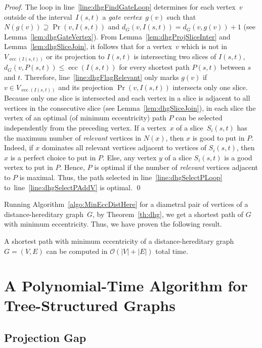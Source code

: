\documentclass[10pt]{llncs}
\newcommand{\calO}{\mathcal{O}}
\DeclareMathOperator{\ecc}{ecc}
\begin{document}
\begin{proof}
The loop in line~\ref{line:dhgFindGateLoop} determines for each vertex~$v$ outside of the interval~$I(s,t)$ a \emph{gate vertex}~$g(v)$ such that $N(g(v)) \supseteq \Pr(v, I(s,t))$ and $d_G(v, I(s,t)) = d_G(v, g(v)) + 1$ (see Lemma~\ref{lem:dhgGateVertex}).
From Lemma~\ref{lem:dhgProjSliceInter} and Lemma~\ref{lem:dhgSliceJoin}, it follows that for a vertex~$v$ which is not in $V_{\ecc(I(s,t))}$ or its projection to $I(s,t)$ is intersecting two slices of $I(s,t)$, $d_G(v,P(s,t)) \leq \ecc(I(s,t))$ for every shortest path $P(s,t)$ between $s$ and $t$.
Therefore, line~\ref{line:dhgFlagRelevant} only marks $g(v)$ if $v \in V_{\ecc(I(s,t))}$ and its projection $\Pr(v, I(s,t))$ intersects only one slice. 
Because only one slice is intersected and each vertex in a slice is adjacent to all vertices in the consecutive slice (see Lemma~\ref{lem:dhgSliceJoin}), in each slice the vertex of an optimal (of minimum eccentricity) path $P$ can be selected independently from the preceding vertex.
If a vertex~$x$ of a slice~$S_i(s,t)$ has the maximum number of \emph{relevant} vertices in $N(x)$, then $x$ is good to put in $P$.
Indeed, if $x$ dominates all relevant vertices adjacent to vertices of $S_i(s,t)$, then $x$ is a perfect choice to put in $P$.
Else, any vertex $y$ of a slice $S_i(s,t)$ is a good vertex to put in $P$. 
Hence, $P$ is optimal if the number of \emph{relevant} vertices adjacent to $P$ is maximal.
Thus, the path selected in line~\ref{line:dhgSelectPLoop} to~line~\ref{line:dhgSelectPAddV} is optimal.
\qed
\end{proof}

Running Algorithm~\ref{algo:MinEccDistHere} for a diametral pair of vertices of a distance-hereditary graph~$G$, by Theorem~\ref{th:dhg}, we get a shortest path of $G$ with minimum eccentricity.
Thus, we have proven the following result. 

\begin{theorem}
    \label{tm:opt-path} 
A shortest path with minimum eccentricity of a distance-hereditary graph $G=(V,E)$ can be computed in $\calO(|V| + |E|)$ total time.
\end{theorem}

\section{A Polynomial-Time Algorithm for Tree-Structured Graphs}

\subsection{Projection Gap}
\end{document}
